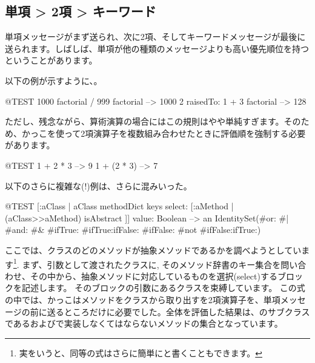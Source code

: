 \documentclass[a4paper,10pt,twoside]{book}
\begin{document}
\subsection*{単項 > 2項 > キーワード}
単項メッセージがまず送られ、次に2項、そしてキーワードメッセージが最後に送られます。しばしば、単項が他の種類のメッセージよりも高い優先順位を持つということがあります。


以下の例が示すように、。
\begin{code}{@TEST}
1000 factorial / 999 factorial --> 1000
2 raisedTo: 1 + 3 factorial     --> 128
\end{code}
\noindent

ただし、残念ながら、算術演算の場合にはこの規則はやや単純すぎます。そのため、かっこを使って2項演算子を複数組み合わせたときに評価順を強制する必要があります。
\begin{code}{@TEST}
1 + 2 * 3   --> 9
1 + (2 * 3) --> 7
\end{code}

以下のさらに複雑な(!)例は、さらに混みいった。
\begin{code}{@TEST}
[:aClass | aClass methodDict keys select: [:aMethod | (aClass>>aMethod) isAbstract ]] value: Boolean --> an IdentitySet(#or: #| #and: #& #ifTrue: #ifTrue:ifFalse: #ifFalse: #not #ifFalse:ifTrue:)
\end{code}
\noindent
ここでは、クラスのどのメソッドが抽象メソッドであるかを調べようとしています\footnote{実をいうと、同等の式はさらに簡単にと書くこともできます。}.
まず、引数として渡されたクラスに, そのメソッド辞書のキー集合を問い合わせ、その中から、抽象メソッドに対応しているものを選択(select)するブロックを記述します。
そのブロックの引数にあるクラスを束縛しています。
この式の中では、かっこはメソッドをクラスから取り出すを2項演算子\ct{>>}を、単項メッセージ\mbox{}の前に送るところだけに必要でした。全体を評価した結果は、のサブクラスであるおよびで実装しなくてはならないメソッドの集合となっています。
\end{document}
